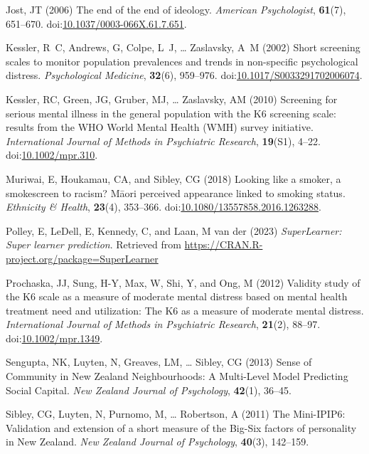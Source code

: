 \documentclass[
  singlecolumn,
  9pt]{article}
\newlength{\cslhangindent}
\newenvironment{CSLReferences}[2] %
 {\begin{list}{}{%
  \setlength{\itemindent}{0pt}
  \setlength{\leftmargin}{0pt}
  \setlength{\parsep}{0pt}
  \ifodd #1
   \setlength{\leftmargin}{\cslhangindent}
   \setlength{\itemindent}{-1\cslhangindent}
  \fi
  \setlength{\itemsep}{#2\baselineskip}}}
 {\end{list}}
\begin{document}
\begin{CSLReferences}{1}{0}
Jost, JT (2006) The end of the end of ideology. \emph{American
Psychologist}, \textbf{61}(7), 651--670.
doi:\href{https://doi.org/10.1037/0003-066X.61.7.651}{10.1037/0003-066X.61.7.651}.

Kessler, R~C, Andrews, G, Colpe, L~J, \ldots{} Zaslavsky, A~M (2002)
Short screening scales to monitor population prevalences and trends in
non-specific psychological distress. \emph{Psychological Medicine},
\textbf{32}(6), 959--976.
doi:\href{https://doi.org/10.1017/S0033291702006074}{10.1017/S0033291702006074}.

Kessler, RC, Green, JG, Gruber, MJ, \ldots{} Zaslavsky, AM (2010)
Screening for serious mental illness in the general population with the
K6 screening scale: results from the WHO World Mental Health (WMH)
survey initiative. \emph{International Journal of Methods in Psychiatric
Research}, \textbf{19}(S1), 4--22.
doi:\href{https://doi.org/10.1002/mpr.310}{10.1002/mpr.310}.

Muriwai, E, Houkamau, CA, and Sibley, CG (2018) Looking like a smoker, a
smokescreen to racism? Māori perceived appearance linked to smoking
status. \emph{Ethnicity \& Health}, \textbf{23}(4), 353--366.
doi:\href{https://doi.org/10.1080/13557858.2016.1263288}{10.1080/13557858.2016.1263288}.

Polley, E, LeDell, E, Kennedy, C, and Laan, M van der (2023)
\emph{SuperLearner: Super learner prediction}. Retrieved from
\url{https://CRAN.R-project.org/package=SuperLearner}

Prochaska, JJ, Sung, H-Y, Max, W, Shi, Y, and Ong, M (2012) Validity
study of the K6 scale as a measure of moderate mental distress based on
mental health treatment need and utilization: The K6 as a measure of
moderate mental distress. \emph{International Journal of Methods in
Psychiatric Research}, \textbf{21}(2), 88--97.
doi:\href{https://doi.org/10.1002/mpr.1349}{10.1002/mpr.1349}.

Sengupta, NK, Luyten, N, Greaves, LM, \ldots{} Sibley, CG (2013) Sense
of Community in New Zealand Neighbourhoods: A Multi-Level Model
Predicting Social Capital. \emph{New Zealand Journal of Psychology},
\textbf{42}(1), 36--45.

Sibley, CG, Luyten, N, Purnomo, M, \ldots{} Robertson, A (2011) The
Mini-IPIP6: Validation and extension of a short measure of the Big-Six
factors of personality in New Zealand. \emph{New Zealand Journal of
Psychology}, \textbf{40}(3), 142--159.


\end{CSLReferences}
\end{document}
